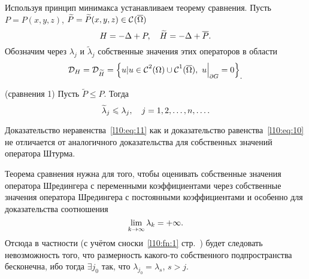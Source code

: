 Используя принцип минимакса устанавливаем теорему сравнения. Пусть $P=P(x,y,z)$, $\widetilde{P}=\widetilde{P}(x,y,z)\in\mathcal{C}{\mathstrut}^{}_{}(\overline{\Omega})$
\begin{equation*}
	\hfill H=-\Delta+P,\quad \widetilde{H}=-\Delta+\overline{P}.\hfill
\end{equation*}
Обозначим через $\lambda_j$ и $\widetilde{\lambda}_j$ собственные значения этих операторов в области 
\begin{equation*}
	\hfill\mc{D}_{H}=\mc{D}_{\widetilde{H}}=\left\{u|u\in\Cfn{2}(\Omega)\cup\Cfn{1}(\overline{\Omega}),\ u\Big|_{\partial G}=0\right\}_{\displaystyle.}\hfill
\end{equation*}
\begin{_teor}(сравнения 1)
	Пусть $\widetilde{P}\leqslant P$. Тогда 
	\begin{equation}\label{l10:eq:11}
		\hfill\widetilde{\lambda}_j\leqslant\lambda_j,\quad j=1,2,\ldots,n,\ldots.\hfill
	\end{equation}
\end{_teor}
Доказательство неравенства~\eqref{l10:eq:11} как и доказательство равенства~\eqref{l10:eq:10} не отличается от аналогичного доказательства для собственных значений оператора Штурма.

Теорема сравнения нужна для того, чтобы оценивать собственные значения оператора Шредингера с переменными коэффициентами через собственные значения оператора Шредингера с постоянными коэффициентами и особенно для доказательства соотношения
\begin{equation*}
	\hfill\lim\limits_{k\to\infty}\lambda_k=+\infty.\hfill
\end{equation*}
Отсюда в частности (с учётом сноски~\ref{l10:fn:1} стр.~\pageref{l10:fn:1}) будет следовать невозможность того, что размерность какого-то собственного подпространства бесконечна, ибо тогда $\exists j_0$ так, что $\lambda_{j_0}=\lambda_s$, $s>j$.

